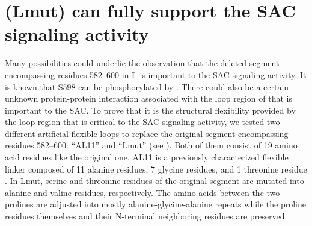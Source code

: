 \section{(Lmut) can fully support the SAC signaling activity}

Many possibilities could underlie the observation that the deleted segment encompassing residues 582--600 in \textDelta{}L is important to the SAC signaling activity. It is known that S598 can be phosphorylated by   \cite{MAD1_pS598}. There could also be a certain unknown protein-protein interaction associated with the loop region of  that is important to the SAC. To prove that it is the structural flexibility provided by the loop region that is critical to the SAC signaling activity, we tested two different artificial flexible loops to replace the original segment encompassing residues 582--600: ``AL11'' and ``Lmut'' (see ). Both of them consist of 19 amino acid residues like the original one. AL11 is a previously characterized flexible linker composed of 11 alanine residues, 7 glycine residues, and 1 threonine residue \cite{AL11}. In Lmut, serine and threonine residues of the original segment are mutated into alanine and valine residues, respectively. The amino acids between the two prolines are adjusted into mostly alanine-glycine-alanine repeats while the proline residues themselves and their N-terminal neighboring residues are preserved. %

